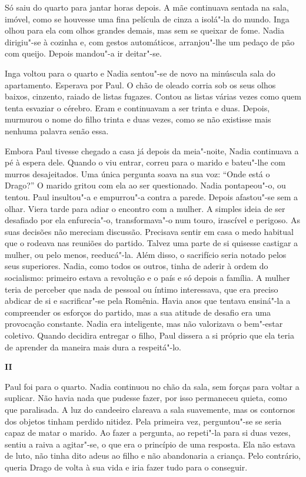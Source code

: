 Só saiu do quarto para jantar horas depois. A mãe continuava sentada
na sala, imóvel, como se houvesse uma fina película de cinza a isolá"-la
do mundo. Inga olhou para ela com olhos grandes demais, mas sem se
queixar de fome. Nadia dirigiu"-se à cozinha e, com gestos automáticos,
arranjou"-lhe um pedaço de pão com queijo. Depois mandou"-a ir deitar"-se.

Inga voltou para o quarto e Nadia sentou"-se de novo na minúscula sala do
apartamento. Esperava por Paul. O chão de oleado corria sob os seus
olhos baixos, cinzento, raiado de listas fugazes. Contou as listas
várias vezes como quem tenta esvaziar o cérebro. Eram e continuavam a
ser trinta e duas. Depois, murmurou o nome do filho trinta e duas vezes,
como se não existisse mais nenhuma palavra senão essa.

Embora Paul tivesse chegado a casa já depois da meia"-noite, Nadia continuava a pé à espera dele. Quando o viu entrar, correu
para o marido e bateu"-lhe com murros desajeitados. Uma única pergunta
soava na sua voz: ``Onde está o Drago?'' O marido gritou com ela ao ser
questionado. Nadia pontapeou"-o, ou tentou. Paul insultou"-a e
empurrou"-a contra a parede. Depois afastou"-se sem a olhar. Viera tarde
para adiar o encontro com a mulher. A simples ideia de ser desafiado por
ela enfurecia"-o, transformava"-o num touro, irascível e perigoso. As suas
decisões não mereciam discussão. Precisava sentir em
casa o medo habitual que o rodeava nas reuniões do partido. Talvez uma
parte de si quisesse castigar a mulher, ou pelo menos, reeducá"-la. Além
disso, o sacrifício seria notado pelos seus superiores. Nadia, como
todos os outros, tinha de aderir à ordem do socialismo: primeiro estava
a revolução e o país e só depois a família. A mulher teria de perceber
que nada de pessoal ou íntimo interessava, que era preciso abdicar de
si e sacrificar"-se pela Romênia. Havia anos que tentava ensiná"-la a
compreender os esforços do partido, mas a sua atitude de desafio era uma
provocação constante. Nadia era inteligente, mas não valorizava o
bem"-estar coletivo. Quando decidira entregar o filho, Paul dissera a
si próprio que ela teria de aprender da maneira mais dura a
respeitá"-lo.


\pagebreak
\thispagestyle{empty}
\movetooddpage
\vspace*{1.8cm}
\noindent{}\textbf{II}

\bigskip


\noindent{}Paul foi para o quarto. Nadia continuou no chão da sala, sem forças para
voltar a suplicar. Não havia nada que pudesse fazer, por isso permaneceu
quieta, como que paralisada. A luz do candeeiro clareava a sala
suavemente, mas os contornos dos objetos tinham perdido nitidez. Pela
primeira vez, perguntou"-se se seria capaz de matar o marido. Ao fazer a
pergunta, ao repeti"-la para si duas vezes, sentiu a raiva a agitar"-se, o
que era o princípio de uma resposta. Ela não estava de luto, não tinha
dito adeus ao filho e não abandonaria a criança. Pelo contrário, queria
Drago de volta à sua vida e iria fazer tudo para o conseguir.

